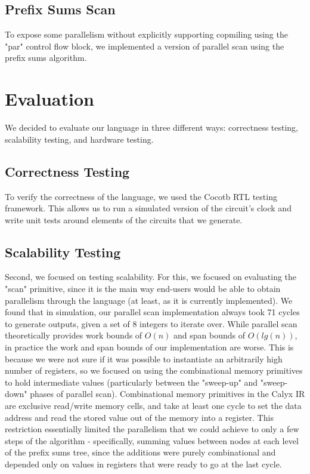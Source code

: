 \documentclass[12pt]{article}
\begin{document}
\subsection{Prefix Sums Scan}
To expose some parallelism without explicitly supporting copmiling using the "par" control flow block,
we implemented a version of parallel scan using the prefix sums algorithm.

\section{Evaluation}
We decided to evaluate our language in three different ways: correctness testing, scalability testing, and hardware testing.
\subsection{Correctness Testing}
To verify the correctness of the language, we used the Cocotb RTL testing framework. This allows
us to run a simulated version of the circuit's clock and write unit tests around elements of the circuits
that we generate.
\subsection{Scalability Testing}
Second, we focused on testing scalability. For this, we focused on evaluating the "scan" primitive, since
it is the main way end-users would be able to obtain parallelism through the language (at least, as it is currently implemented).
We found that in simulation, our parallel scan implementation always took 71 cycles to generate outputs, given a set of 8 integers
to iterate over. While parallel scan theoretically provides work bounds of $O(n)$ and span bounds of $O(lg(n))$, in practice the
work and span bounds of our implementation are worse. This is because we were not sure if it was possible to instantiate
an arbitrarily high number of registers, so we focused on using the combinational memory primitives to hold intermediate values
(particularly between the "sweep-up" and "sweep-down" phases of parallel scan). Combinational memory primitives in the Calyx IR
are exclusive read/write memory cells, and take at least one cycle to set the data address and read the stored value out of the memory
into a register. This restriction essentially limited the parallelism that we could achieve to only a few steps of the algorithm - specifically,
summing values between nodes at each level of the prefix sums tree, since the additions were purely combinational and depended only
on values in registers that were ready to go at the last cycle.
\end{document}
